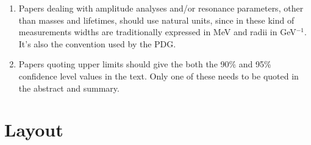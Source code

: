 \begin{enumerate}
\item Papers dealing with amplitude analyses and/or resonance parameters, 
      other than masses and lifetimes, should use natural units,
      since in these kind of measurements widths are traditionally 
      expressed in MeV and radii in GeV$^{-1}$. It's also the convention
      used by the PDG. 

\item Papers quoting upper limits should give the both the 90\% and
  95\% confidence level values in the text. Only one of these needs to
  be quoted in the abstract and summary.
\end{enumerate}

\section{Layout}

